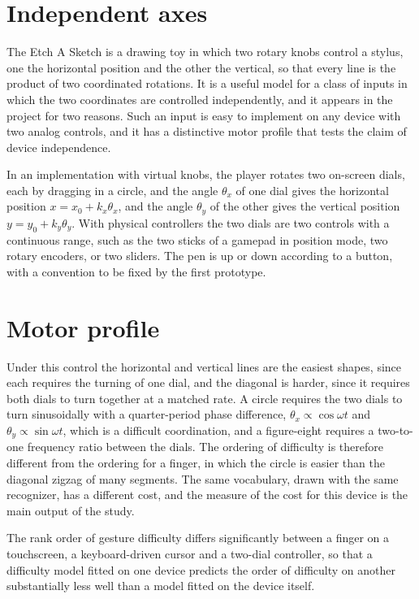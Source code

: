\section{Independent axes}

The Etch A Sketch is a drawing toy in which two rotary knobs control a stylus, one the horizontal position and the other the vertical, so that every line is the product of two coordinated rotations. It is a useful model for a class of inputs in which the two coordinates are controlled independently, and it appears in the project for two reasons. Such an input is easy to implement on any device with two analog controls, and it has a distinctive motor profile that tests the claim of device independence.

In an implementation with virtual knobs, the player rotates two on-screen dials, each by dragging in a circle, and the angle $\theta_x$ of one dial gives the horizontal position $x=x_0+k_x\theta_x$, and the angle $\theta_y$ of the other gives the vertical position $y=y_0+k_y\theta_y$. With physical controllers the two dials are two controls with a continuous range, such as the two sticks of a gamepad in position mode, two rotary encoders, or two sliders. The pen is up or down according to a button, with a convention to be fixed by the first prototype.

\section{Motor profile}

Under this control the horizontal and vertical lines are the easiest shapes, since each requires the turning of one dial, and the diagonal is harder, since it requires both dials to turn together at a matched rate. A circle requires the two dials to turn sinusoidally with a quarter-period phase difference, $\theta_x\propto\cos\omega t$ and $\theta_y\propto\sin\omega t$, which is a difficult coordination, and a figure-eight requires a two-to-one frequency ratio between the dials. The ordering of difficulty is therefore different from the ordering for a finger, in which the circle is easier than the diagonal zigzag of many segments. The same vocabulary, drawn with the same recognizer, has a different cost, and the measure of the cost for this device is the main output of the study.

\begin{hypothesis}\label{hyp:device-cost}
The rank order of gesture difficulty differs significantly between a finger on a touchscreen, a keyboard-driven cursor and a two-dial controller, so that a difficulty model fitted on one device predicts the order of difficulty on another substantially less well than a model fitted on the device itself.\evH
\end{hypothesis}

